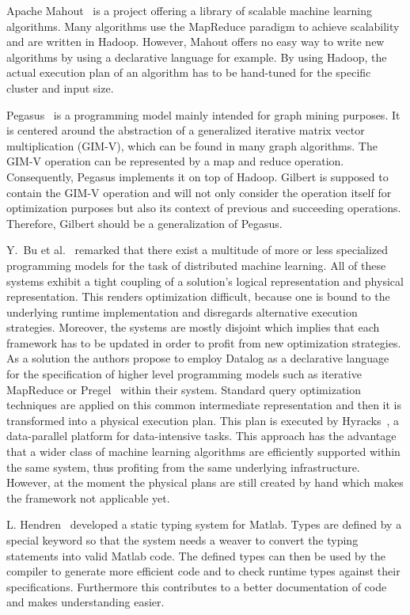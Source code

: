 \documentclass{dima}
\begin{document}
Apache Mahout~\cite{apache:a2011} is a project offering a library of scalable machine learning algorithms.
Many algorithms use the MapReduce paradigm to achieve scalability and are written in Hadoop.
However, Mahout offers no easy way to write new algorithms by using a declarative language for example.
By using Hadoop, the actual execution plan of an algorithm has to be hand-tuned for the specific cluster and input size.

Pegasus~\cite{kang:2009a} is a programming model mainly intended for graph mining purposes.
It is centered around the abstraction of a generalized iterative matrix vector multiplication (GIM-V), which can be found in many graph algorithms.
The GIM-V operation can be represented by a map and reduce operation.
Consequently, Pegasus implements it on top of Hadoop.
Gilbert is supposed to contain the GIM-V operation and will not only consider the operation itself for optimization purposes but also its context of previous and succeeding operations.
Therefore, Gilbert should be a generalization of Pegasus.

Y.~Bu et al.~\cite{bu:apa2012a} remarked that there exist a multitude of more or less specialized programming models for the task of distributed machine learning.
All of these systems exhibit a tight coupling of a solution's logical representation and physical representation.
This renders optimization difficult, because one is bound to the underlying runtime implementation and disregards alternative execution strategies.
Moreover, the systems are mostly disjoint which implies that each framework has to be updated in order to profit from new optimization strategies.
As a solution the authors propose to employ Datalog as a declarative language for the specification of higher level programming models such as iterative MapReduce or Pregel~\cite{malewicz:2010a} within their system.
Standard query optimization techniques are applied on this common intermediate representation and then it is transformed into a physical execution plan.
This plan is executed by Hyracks~\cite{borkar:2011a}, a data-parallel platform for data-intensive tasks.
This approach has the advantage that a wider class of machine learning algorithms are efficiently supported within the same system, thus profiting from the same underlying infrastructure.
However, at the moment the physical plans are still created by hand which makes the framework not applicable yet.

L. Hendren~\cite{hendren:2011a} developed a static typing system for Matlab.
Types are defined by a special keyword so that the system needs a weaver to convert the typing statements into valid Matlab code.
The defined types can then be used by the compiler to generate more efficient code and to check runtime types against their specifications.
Furthermore this contributes to a better documentation of code and makes understanding easier.
\end{document}
